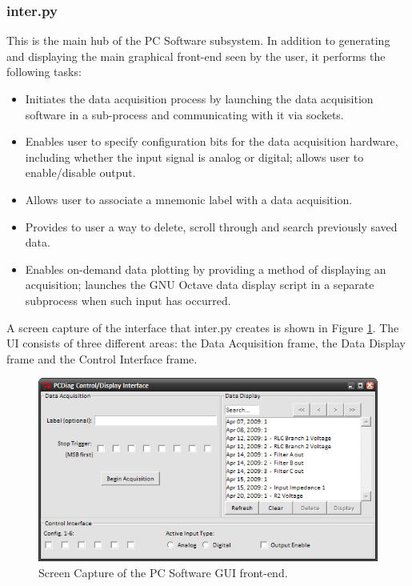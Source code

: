 \subsubsection[inter.py]{inter.py}
This is the main hub of the PC Software subsystem. In addition to generating and displaying the 
main graphical front-end seen by the user, it performs the following tasks:

\begin{itemize}
\item Initiates the data acquisition process by launching the data acquisition software in a 
sub-process and communicating with it via sockets.
\item Enables user to specify configuration bits for the data acquisition hardware, including 
whether the input signal is analog or digital; allows user to enable/disable output.
\item Allows user to associate a mnemonic label with a data acquisition.
\item Provides to user a way to delete, scroll through and search previously saved data.
\item Enables on-demand data plotting by providing a method of displaying an acquisition; launches 
the GNU Octave data display script in a separate subprocess when such input has occurred.
\end{itemize}


A screen capture of the interface that inter.py creates is shown in Figure \ref{fig:pcsoft inter ss}. The
UI consists of three different areas: the Data Acquisition frame, the Data Display frame and the
Control Interface frame.

\begin{figure}[bhp]
\begin{center}
\includegraphics[scale=0.6]{../drawings/pcsoft_inter_ss.png}
\end{center}
\caption[PC Software Interface Screen Capture]{Screen Capture of the PC Software GUI front-end.}
\label{fig:pcsoft inter ss}
\end{figure}


